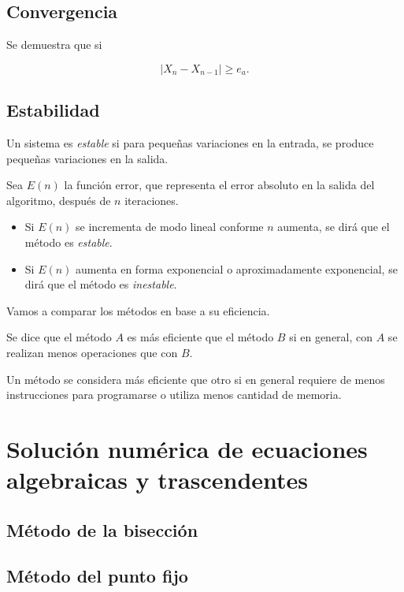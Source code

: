 \documentclass[
	a4paper,
	11pt,
	oneside
]{scrreprt}
\begin{document}
\section{Convergencia}

Se demuestra que si

\[ \left|X_{n}-X_{n-1}\right|\ge e_{a}. \]

\section{Estabilidad}
Un sistema es \emph{estable} si para pequeñas variaciones en la entrada, se produce pequeñas variaciones en la salida.

Sea $E\left(n\right)$ la función error, que representa el error absoluto en la salida del algoritmo, después de $n$ iteraciones.

\begin{itemize}
	\item Si $E\left(n\right)$ se incrementa de modo lineal conforme $n$ aumenta, se dirá que el método es \textit{estable}.
	\item Si $E\left(n\right)$ aumenta en forma exponencial o aproximadamente exponencial, se dirá que el método es \textit{inestable}.
\end{itemize}

Vamos a comparar los métodos en base a su eficiencia.

Se dice que el método $A$ es más eficiente que el método $B$ si en general, con $A$ se realizan menos operaciones que con $B$.

Un método se considera más eficiente que otro si en general requiere de menos instrucciones para programarse o utiliza menos cantidad de memoria.

\chapter{Solución numérica de ecuaciones algebraicas y trascendentes}

\section{Método de la bisección}

\section{Método del punto fijo}
\end{document}
